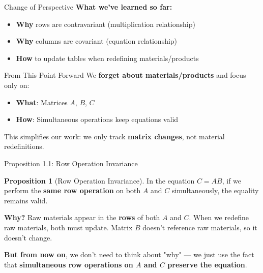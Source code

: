 \documentclass[10pt]{beamer}
\theoremstyle{definition}
\newtheorem{prop}{Proposition}[section]
\newcommand{\x}[1]{\alert{\textbf{#1}}}
\begin{document}
\begin{frame}{Change of Perspective}
\textbf{What we've learned so far:}
\begin{itemize}
\item \x{Why} rows are contravariant (multiplication relationship)
\item \x{Why} columns are covariant (equation relationship)
\item \x{How} to update tables when redefining materials/products
\end{itemize}

\vspace{0.5cm}
\begin{alertblock}{From This Point Forward}
We \x{forget about materials/products} and focus only on:
\begin{itemize}
\item \textbf{What}: Matrices $A$, $B$, $C$
\item \textbf{How}: Simultaneous operations keep equations valid
\end{itemize}
\end{alertblock}

\vspace{0.3cm}
This simplifies our work: we only track \x{matrix changes}, not material redefinitions.
\end{frame}

\begin{frame}{Proposition 1.1: Row Operation Invariance}
\begin{prop}[Row Operation Invariance]
In the equation $C = AB$, if we perform the \x{same row operation} on both $A$ and $C$ simultaneously, the equality remains valid.
\end{prop}

\vspace{0.3cm}
\textbf{Why?} Raw materials appear in the \x{rows} of both $A$ and $C$. When we redefine raw materials, both must update. Matrix $B$ doesn't reference raw materials, so it doesn't change.

\vspace{0.3cm}
\textbf{But from now on}, we don't need to think about "why" — we just use the fact that \x{simultaneous row operations on $A$ and $C$ preserve the equation}.
\end{frame}
\end{document}
